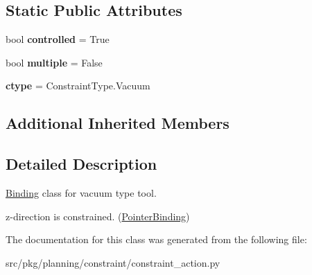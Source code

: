 \subsection*{Static Public Attributes}
\begin{DoxyCompactItemize}
\item 
\mbox{\label{classrnb-planning_1_1src_1_1pkg_1_1planning_1_1constraint_1_1constraint__action_1_1_vacuum_tool_a4572dd284b8111e0b2113376ad142ce1}} 
bool {\bfseries controlled} = True
\item 
\mbox{\label{classrnb-planning_1_1src_1_1pkg_1_1planning_1_1constraint_1_1constraint__action_1_1_vacuum_tool_ac995953e97f401aafb648f47ebbba877}} 
bool {\bfseries multiple} = False
\item 
\mbox{\label{classrnb-planning_1_1src_1_1pkg_1_1planning_1_1constraint_1_1constraint__action_1_1_vacuum_tool_a8a327077662b8c64ca1e1d6beeb9f622}} 
{\bfseries ctype} = Constraint\+Type.\+Vacuum
\end{DoxyCompactItemize}
\subsection*{Additional Inherited Members}


\subsection{Detailed Description}
\hyperlink{classrnb-planning_1_1src_1_1pkg_1_1planning_1_1constraint_1_1constraint__action_1_1_binding}{Binding} class for vacuum type tool. 

z-\/direction is constrained. (\hyperlink{classrnb-planning_1_1src_1_1pkg_1_1planning_1_1constraint_1_1constraint__action_1_1_pointer_binding}{Pointer\+Binding}) 

The documentation for this class was generated from the following file\+:\begin{DoxyCompactItemize}
\item 
src/pkg/planning/constraint/constraint\+\_\+action.\+py\end{DoxyCompactItemize}
